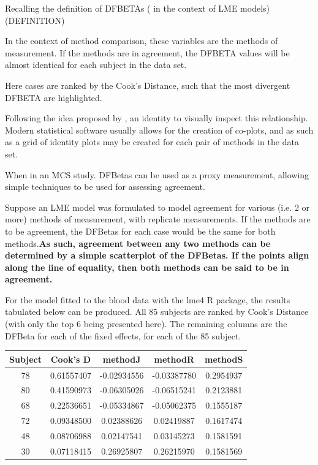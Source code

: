\documentclass[12pt, a4paper]{report}
\theoremstyle{plain}
\theoremstyle{definition}
\theoremstyle{remark}
\begin{document}
	Recalling the definition of DFBETAs ( in the context of LME models) (DEFINITION)
	
	In the context of method comparison, these variables are the methods of measurement. If the methods are in agreement, the DFBETA values will be almost identical for each subject in
	the data set. 
	
	Here cases are ranked by the Cook's Distance, such that the most divergent DFBETA are highlighted.
	
	
	
	Following the idea proposed by \citet{BA86}, an identity to visually inspect this relationship. Modern statistical software usually allows for the creation of co-plots, and as such as
	a grid of identity plots may be created for each pair of methods in the data set.
	
	
	When in an MCS study. DFBetas can be used as a proxy measurement, allowing simple techniques to be used for assessing agreement.
	
	Suppose an LME model was formulated to model agreement for various (i.e. 2 or more) methods of measurement, with replicate measurements. If the methods are to be agreement, the DFBetas for each case would be the same for both methods.\textbf{As such, agreement between any two methods can be determined by a simple scatterplot of the DFBetas. If the points align along the line of equality, then both methods can be said to be in agreement.}
	
	For the model fitted to the blood data with the lme4 R package, the results tabulated below can be produced. All 85 subjects are ranked by Cook's Distance (with only the top 6 being presented here). The remaining columns are the DFBeta for each of the fixed effects, for each of the 85 subject.
	\begin{center}
		\begin{tabular}{|c|c|c|c|c|} \hline
			Subject &    Cook's D  &    methodJ  &   methodR  & methodS \\ \hline \hline
			78 & 0.61557407 & -0.02934556 & -0.03387780 & 0.2954937  \\ \hline
			80 & 0.41590973 & -0.06305026 & -0.06515241 & 0.2123881  \\ \hline
			68 & 0.22536651 & -0.05334867 & -0.05062375 & 0.1555187  \\ \hline
			72 & 0.09348500  & 0.02388626  & 0.02419887 & 0.1617474  \\ \hline
			48 & 0.08706988  & 0.02147541  & 0.03145273 & 0.1581591  \\ \hline
			30 & 0.07118415  & 0.26925807  & 0.26215970 & 0.1581569  \\ \hline
		\end{tabular} 
	\end{center}
	
\end{document}
